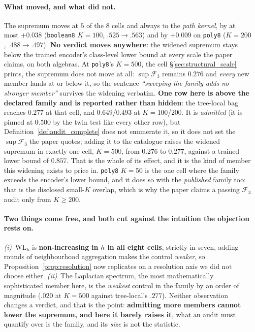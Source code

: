 \paragraph{What moved, and what did not.} The supremum moves at $5$ of the $8$ cells and always to the \emph{path kernel}, by at most $\mathbf{+0.038}$ (\texttt{boolean8} $K{=}100$, $.525\to.563$) and by $+0.009$ on \texttt{poly8} ($K{=}200$, $.488\to.497$). \textbf{No verdict moves anywhere}: the widened supremum stays below the trained encoder's class-level lower bound at every scale the paper claims, on both algebras. At \texttt{poly8}'s $K{=}500$, the cell \S\ref{sec:structural_scale} prints, the supremum does not move at all: $\sup\mathcal{F}_3$ remains $0.276$ and \emph{every} new member lands at or below it, so the sentence \emph{``sweeping the family adds no stronger member''} survives the widening verbatim. \textbf{One row here is above the declared family and is reported rather than hidden}: the tree-local bag reaches $0.277$ at that cell, and $0.649$/$0.493$ at $K{=}100$/$200$. It is \emph{admitted} (it is pinned at $0.500$ by the twin test like every other row), but Definition~\ref{def:audit_complete} does not enumerate it, so it does not set the $\sup\mathcal{F}_3$ the paper quotes; adding it to the catalogue raises the widened supremum in exactly one cell, $K{=}500$, from $0.276$ to $0.277$, against a trained lower bound of $0.857$. That is the whole of its effect, and it is the kind of member this widening exists to price in. \texttt{poly8} $K{=}50$ is the one cell where the family exceeds the encoder's lower bound, and it does so with the \emph{published} family too: that is the disclosed small-$K$ overlap, which is why the paper claims a passing $\mathcal{F}_3$ audit only from $K{\geq}200$.

\paragraph{Two things come free, and both cut against the intuition the objection rests on.} \emph{(i)}~$\mathrm{WL}_h$ is \textbf{non-increasing in $h$ in all eight cells}, strictly in seven, adding rounds of neighbourhood aggregation makes the control \emph{weaker}, so Proposition~\ref{prop:resolution} now replicates on a resolution axis we did not choose either. \emph{(ii)}~The Laplacian spectrum, the most mathematically sophisticated member here, is the \emph{weakest} control in the family by an order of magnitude ($.020$ at $K{=}500$ against tree-local's $.277$). Neither observation changes a verdict, and that is the point: \textbf{admitting more members cannot lower the supremum, and here it barely raises it}, what an audit must quantify over is the family, and its \emph{size} is not the statistic.


